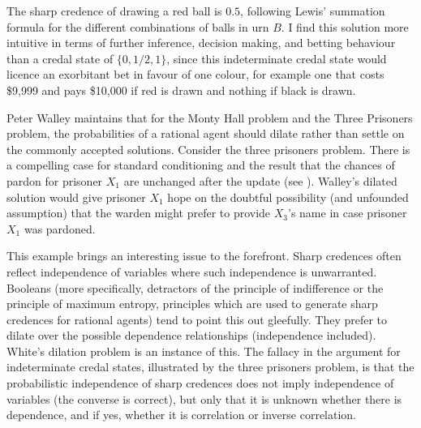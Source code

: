 The sharp credence of drawing a red ball is $0.5$,
following Lewis' summation formula for the different
combinations of balls in urn $B$. I find this solution
more intuitive in terms of further inference, decision
making, and betting behaviour than a credal state of
$\{0,1/2,1\}$, since this indeterminate credal state
would licence an exorbitant bet in favour of one
colour, for example one that costs \$9,999 and pays
\$10,000 if red is drawn and nothing if black is drawn.


Peter Walley maintains that for the Monty Hall problem
and the Three Prisoners problem, the probabilities of a
rational agent should dilate rather than settle on the
commonly accepted solutions. Consider the three
prisoners problem. There is a compelling case for
standard conditioning and the result that the chances
of pardon for prisoner $X_{1}$ are unchanged after the
update (see ). Walley's
dilated solution would give prisoner $X_{1}$ hope on
the doubtful possibility (and unfounded assumption)
that the warden might prefer to provide $X_{3}$'s name
in case prisoner $X_{1}$ was pardoned.

This example brings an interesting issue to the
forefront. Sharp credences often reflect independence
of variables where such independence is unwarranted.
Booleans (more specifically, detractors of the
principle of indifference or the principle of maximum
entropy, principles which are used to generate sharp
credences for rational agents) tend to point this out
gleefully. They prefer to dilate over the possible
dependence relationships (independence included).
White's dilation problem is an instance of this. The
fallacy in the argument for indeterminate credal
states, illustrated by the three prisoners problem, is
that the probabilistic independence of sharp credences
does not imply independence of variables (the converse
is correct), but only that it is unknown whether there
is dependence, and if yes, whether it is correlation or
inverse correlation.

